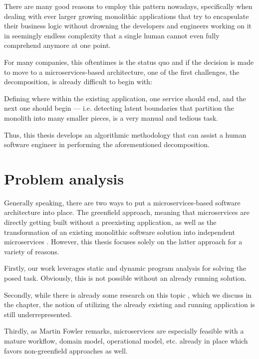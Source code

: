 \documentclass[12pt,a4paper]{report}
\begin{document}
There are many good reasons to employ this pattern nowadays, specifically when
dealing with ever larger growing monolithic applications that try to
encapsulate their business logic without drowning the developers and engineers
working on it in seemingly endless complexity that a single human cannot even
fully comprehend anymore at one point.

For many companies, this oftentimes is the status quo and if the decision is
made to move to a microservices\hyp based architecture, one of the first
challenges, the decomposition, is already difficult to begin with:

Defining where within the existing application, one service should end, and the
next one should begin --- i.e. detecting latent boundaries that partition the
monolith into many smaller pieces, is a very manual and tedious task.

Thus, this thesis develops an algorithmic methodology that can assist a human
software engineer in performing the aforementioned decomposition.



\section{Problem analysis}

Generally speaking, there are two ways to put a microservices\hyp based
software architecture into place. The greenfield approach, meaning that
microservices are directly getting built without a preexisting application, as
well as the transformation of an existing monolithic software solution into
independent microservices \cite{fowler-break-monolith}. However, this thesis
focuses solely on the latter approach for a variety of reasons.

Firstly, our work leverages static and dynamic program analysis for solving the
posed task. Obviously, this is not possible without an already running
solution.

Secondly, while there is already some research on this topic
\cite{fritzsch2018monolith}, which we discuss in the \textit{}
chapter, the notion of utilizing the already existing and running application
is still underrepresented.

Thirdly, as Martin Fowler remarks, microservices are especially feasible with a
mature workflow, domain model, operational model, etc. already in place
\cite{fowler-monolith-first, fowler-microservices-tradeoffs} which favors
non\hyp greenfield approaches as well.
\end{document}
